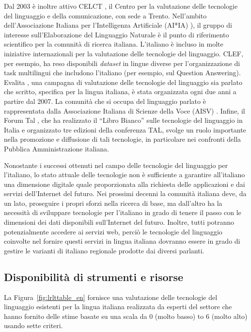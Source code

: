 \documentclass[]{../../metanetpaper}
\begin{document}
\begin{multicols}{2}
Dal 2003 \`{e} inoltre attivo CELCT \cite{celct}, il Centro per la valutazione delle tecnologie del linguaggio e della comunicazione, con sede a Trento. Nell'ambito dell'Associazione Italiana per l'Intelligenza Artificiale (AI*IA) \cite{aixia}), il gruppo di interesse sull'Elaborazione del Linguaggio Naturale \`{e} il punto di riferimento scientifico per la comunit\`{a} di ricerca italiana. L'italiano \`{e} incluso in molte iniziative internazionali per la valutazione delle tecnologie del linguaggio. CLEF, per esempio, ha reso disponibili \emph{dataset} in lingue diverse per l'organizzazione di task multilingui che includono l'italiano (per esempio, sul Question Answering). Evalita \cite{evalita}, una campagna di valutazione delle tecnologie del linguaggio sia parlato che scritto, specifica per la lingua italiana, \`{e} stata organizzata ogni due anni a partire dal 2007. La comunit\`{a} che si occupa del linguaggio parlato \`{e} rappresentata dalla Associazione Italiana di Scienze della Voce (AISV) \cite{aisv}. Infine, il Forum Tal \cite{forumtal}, che ha realizzato il “Libro Bianco” sulle tecnologie del linguaggio in Italia e organizzato tre edizioni della conferenza TAL, svolge un ruolo importante nella promozione e diffusione di tali tecnologie, in particolare nei confronti della Pubblica Amministrazione italiana.

Nonostante i successi ottenuti nel campo delle tecnologie del linguaggio per l'italiano, lo stato attuale delle tecnologie non \`{e} sufficiente a garantire all'italiano una dimensione digitale quale proporzionata alla richiesta delle applicazioni e dai servizi dell'Internet del futuro. Nei prossimi decenni la comunit\`{a} italiana deve, da un lato, proseguire i propri sforzi nella ricerca di base, ma dall'altro ha la necessit\`{a} di sviluppare tecnologie per l'italiano in grado di tenere il passo con le dimensioni dei dati disponibili sull'Internet del futuro. Inoltre, tutti potranno potenzialmente accedere ai servizi web, perci\`{o} le tecnologie del linguaggio coinvolte nel fornire questi servizi in lingua italiana dovranno essere in grado di gestire le varianti di italiano regionale prodotte dai diversi parlanti.



\subsection{Disponibilit\`{a} di strumenti e risorse}

La Figura~\ref{fig:lrlttable_en} fornisce una valutazione delle tecnologie del
linguaggio esistenti per la lingua italiana realizzata da esperti del settore
che hanno fornito delle stime basate su una scala da 0 (molto basso) to 6
(molto alto) usando sette criteri.



\end{multicols}
\end{document}
